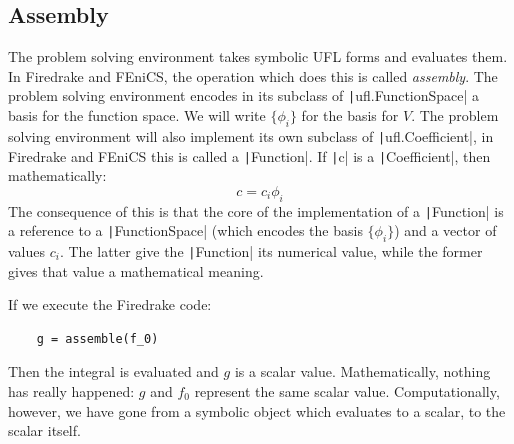 \documentclass[a4paper,11pt]{article}
\begin{document}
\subsection{Assembly}

The problem solving environment takes symbolic UFL forms and evaluates them. In Firedrake and FEniCS, the operation which does this is called \emph{assembly}. The problem solving environment encodes in its subclass of
\texttt|ufl.FunctionSpace| a basis for the function space. We will write $\{\phi_i\}$ for the basis for $V$. The problem solving environment will also implement its own subclass of \texttt|ufl.Coefficient|, in Firedrake and FEniCS this is called a \texttt|Function|. If \texttt|c| is a \texttt|Coefficient|, then mathematically:
\begin{equation}
    c = c_i\phi_i
\end{equation}
The consequence of this is that the core of the implementation of a \texttt|Function| is a reference to a \texttt|FunctionSpace| (which encodes the basis $\{\phi_i\}$) and a vector of values $c_i$. The latter give the \texttt|Function| its numerical value, while the former gives that value a mathematical meaning.

If we execute the Firedrake code:
\begin{verbatim}
    g = assemble(f_0)
\end{verbatim}
Then the integral is evaluated and $g$ is a scalar value. Mathematically, nothing has really happened: $g$ and $f_0$ represent the same scalar value. Computationally, however, we have gone from a symbolic object which evaluates to a scalar, to the scalar itself.
\end{document}
